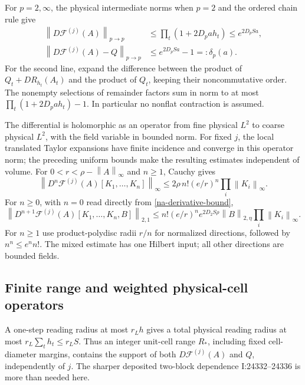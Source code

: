 \documentclass[11pt]{article}
\theoremstyle{remark}\newtheorem{remark}[theorem]{Remark}
\newcommand{\norm}[1]{\left\lVert#1\right\rVert}
\begin{document}
For $p=2,\infty$, the physical intermediate norms when $p=2$ and
the ordered chain rule give
\begin{align}
 \norm{D\mathcal F^{(j)}(A)}_{p\to p}
    &\le\prod_t(1+2D_pa h_t)\le e^{2D_pSa},
 \label{na-derivative-bound}\\
 \norm{D\mathcal F^{(j)}(A)-Q}_{p\to p}
    &\le e^{2D_pSa}-1=:\delta_p(a).
 \label{na-differential-deviation}
\end{align}
For the second line, expand the difference between the product of
$Q_t+DR_{h_t}(A_t)$ and the product of $Q_t$, keeping their
noncommutative order. The nonempty selections of remainder factors
sum in norm to at most $\prod_t(1+2D_pa h_t)-1$. In particular
no nonflat contraction is assumed.

The differential is holomorphic as an operator from fine physical
$L^2$ to coarse physical $L^2$, with the field variable in bounded
norm. For fixed $j$, the local translated Taylor expansions have
finite incidence and converge in this operator norm; the preceding
uniform bounds make the resulting estimates independent of volume.
For $0<r<\rho-\norm{A}_\infty$ and $n\ge1$, Cauchy gives
\begin{equation}
 \norm{D^n\mathcal F^{(j)}(A)[K_1,\ldots,K_n]}_\infty
 \le2\rho\,n!(e/r)^n\prod_i\norm{K_i}_\infty.
 \label{na-cauchy-infty}
\end{equation}
For $n\ge0$, with $n=0$ read directly from
\eqref{na-derivative-bound},
\begin{equation}
 \norm{D^{n+1}\mathcal F^{(j)}(A)[K_1,\ldots,K_n,B]}_{2,1}
 \le n!(e/r)^n e^{2D_2S\rho}
       \norm{B}_{2,\eta}\prod_i\norm{K_i}_\infty.
 \label{na-cauchy-mixed}
\end{equation}
For $n\ge1$ use product-polydisc radii $r/n$ for normalized
directions, followed by $n^n\le e^n n!$. The mixed estimate has one
Hilbert input; all other directions are bounded fields.

\subsection{Finite range and weighted physical-cell operators}
\label{na-weighted}

A one-step reading radius at most $r_Lh$ gives a total physical
reading radius at most $r_L\sum_t h_t\le r_LS$. Thus an integer
unit-cell range $R_*$, including fixed cell-diameter margins,
contains the support of both $D\mathcal F^{(j)}(A)$ and $Q$,
independently of $j$. The sharper deposited two-block dependence
I:24332--24336 is more than needed here.
\end{document}
